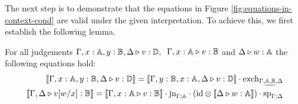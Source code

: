 \documentclass[a4paper,UKenglish,cleveref, autoref, thm-restate]{lipics-v2021}
\begin{document}
The next step is to demonstrate that the equations in Figure \ref{fig:equations-in-context-cond} are valid under the given interpretation. To achieve this, we first establish the following lemma.


\begin{lemma}
\label{lem_interpret_exch:sub} 
For all judgements $\Gamma,x:\mathbb{A}, y:\mathbb{B}, \Delta \triangleright v: \mathbb{D}, \> $
$\Gamma,x:\mathbb{A} \triangleright v: \mathbb{B}$ and $\Delta \triangleright w: \mathbb{A}$  the following
equations hold: 
  \begin{equation*}
\begin{split}
  [\![\Gamma,x:\typeA, y:\typeB, \Delta \vljud v: \typeD]\!] = [\![\Gamma,y:\typeB,x:\typeA,  \Delta \vljud v: \typeD]\! ] \comp \text{exch}_{\Gamma, \underline{ \typeA, \typeB} ,\Delta} \\
  [\![\Gamma, \Delta \vljud v[w/x]: \typeB]\!] = [\![\Gamma, x:\typeA \vljud v: \typeB]\!]\comp \text{jn}_{\Gamma;\typeA} \comp (\text{id} \otimes [\![ \Delta  \vljud w: \typeA]\!] ) \comp \text{sp}_{\Gamma;\Delta} 
\end{split}
  \end{equation*}
\end{lemma}
\end{document}
